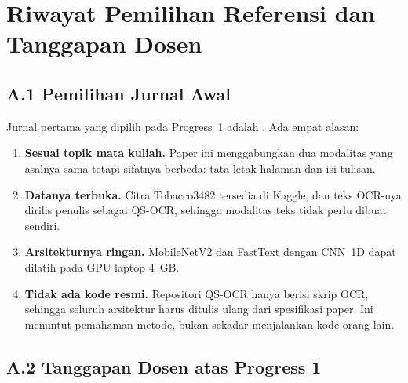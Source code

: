 \chapter{Riwayat Pemilihan Referensi dan Tanggapan Dosen}\label{lam:riwayat}

\section*{A.1 Pemilihan Jurnal Awal}

Jurnal pertama yang dipilih pada Progress~1 adalah \textcite{audebert2020}. Ada empat
alasan:
\begin{enumerate}
  \item \textbf{Sesuai topik mata kuliah.} Paper ini menggabungkan dua modalitas yang
  asalnya sama tetapi sifatnya berbeda: tata letak halaman dan isi tulisan.
  \item \textbf{Datanya terbuka.} Citra Tobacco3482 tersedia di Kaggle, dan teks OCR-nya
  dirilis penulis sebagai QS-OCR, sehingga modalitas teks tidak perlu dibuat sendiri.
  \item \textbf{Arsitekturnya ringan.} MobileNetV2 dan FastText dengan CNN~1D dapat
  dilatih pada GPU laptop 4~GB.
  \item \textbf{Tidak ada kode resmi.} Repositori QS-OCR hanya berisi skrip OCR, sehingga
  seluruh arsitektur harus ditulis ulang dari spesifikasi paper. Ini menuntut pemahaman
  metode, bukan sekadar menjalankan kode orang lain.
\end{enumerate}

\section*{A.2 Tanggapan Dosen atas Progress 1}

